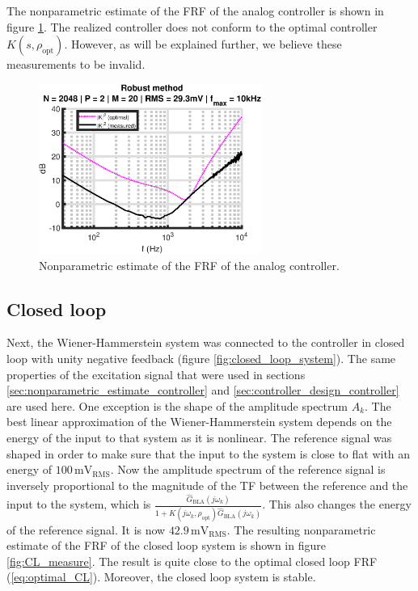 \newpage
The nonparametric estimate of the FRF of the analog controller is shown in figure \ref{fig:controller_nonparam_measure}. The realized controller does not conform to the optimal controller $K(s,\rho_{\mathrm{opt}})$. However, as will be explained further, we believe these measurements to be invalid.

\begin{figure}[H]
\centering
\includegraphics[width = 0.65\textwidth]{figures/robust_method_K.eps}
\caption{Nonparametric estimate of the FRF of the analog controller.}
\label{fig:controller_nonparam_measure}
\end{figure}

\newpage
\subsection{Closed loop}
Next, the Wiener-Hammerstein system was connected to the controller in closed loop with unity negative feedback (figure \ref{fig:closed_loop_system}). The same properties of the excitation signal that were used in sections \ref{sec:nonparametric_estimate_controller} and \ref{sec:controller_design_controller} are used here. One exception is the shape of the amplitude spectrum $A_k$. The best linear approximation of the Wiener-Hammerstein system depends on the energy of the input to that system as it is nonlinear. The reference signal was shaped in order to make sure that the input to the system is close to flat with an energy of $100 \, \mathrm{mV}_\mathrm{RMS}$. Now the amplitude spectrum of the reference signal is inversely proportional to the magnitude of the TF between the reference and the input to the system, which is $\frac{\hat G_{\mathrm{BLA}}(j \omega_k)}{1+K(j \omega_k,\rho_\mathrm{opt}) \hat G_{\mathrm{BLA}}(j \omega_k)}$. This also changes the energy of the reference signal. It is now $42.9 \, \mathrm{mV}_\mathrm{RMS}$. The resulting nonparametric estimate of the FRF of the closed loop system is shown in figure \ref{fig:CL_measure}. The result is quite close to the optimal closed loop FRF (\ref{eq:optimal_CL}). Moreover, the closed loop system is stable.

